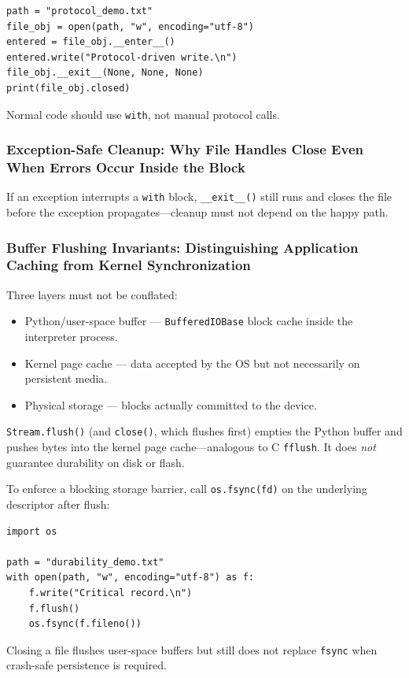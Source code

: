 \begin{verbatim}
path = "protocol_demo.txt"
file_obj = open(path, "w", encoding="utf-8")
entered = file_obj.__enter__()
entered.write("Protocol-driven write.\n")
file_obj.__exit__(None, None, None)
print(file_obj.closed)
\end{verbatim}

Normal code should use \texttt{with}, not manual protocol calls.

\subsubsection{Exception-Safe Cleanup: Why File Handles Close Even When Errors Occur Inside the Block}

If an exception interrupts a \texttt{with} block, \texttt{\_\_exit\_\_()} still runs and closes the file before the exception propagates---cleanup must not depend on the happy path.

\subsubsection{Buffer Flushing Invariants: Distinguishing Application Caching from Kernel Synchronization}

Three layers must not be conflated:

\begin{itemize}
    \item Python/user-space buffer --- \texttt{BufferedIOBase} block cache inside the interpreter process.
    \item Kernel page cache --- data accepted by the OS but not necessarily on persistent media.
    \item Physical storage --- blocks actually committed to the device.
\end{itemize}

\texttt{Stream.flush()} (and \texttt{close()}, which flushes first) empties the Python buffer and pushes bytes into the kernel page cache---analogous to C \texttt{fflush}. It does \emph{not} guarantee durability on disk or flash.

To enforce a blocking storage barrier, call \texttt{os.fsync(fd)} on the underlying descriptor after flush:

\begin{verbatim}
import os

path = "durability_demo.txt"
with open(path, "w", encoding="utf-8") as f:
    f.write("Critical record.\n")
    f.flush()
    os.fsync(f.fileno())
\end{verbatim}

Closing a file flushes user-space buffers but still does not replace \texttt{fsync} when crash-safe persistence is required.
